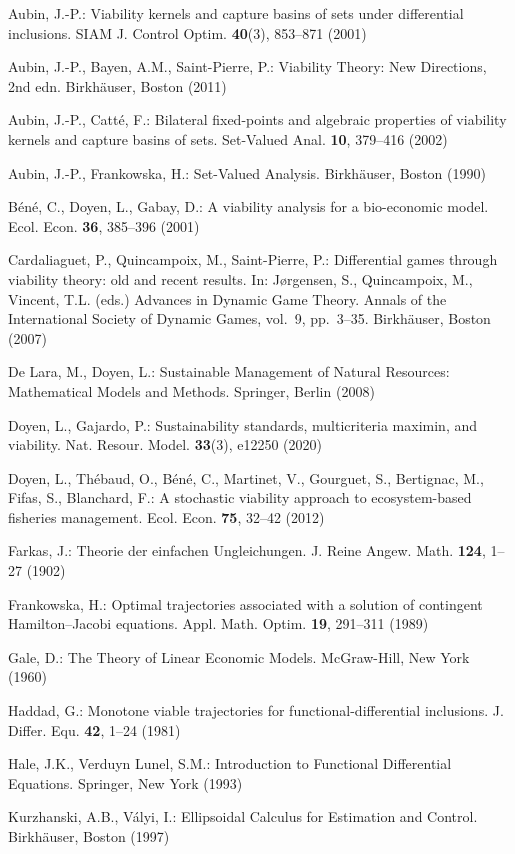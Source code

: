 \documentclass[11pt]{article}
\theoremstyle{definition}
\begin{document}
Aubin, J.-P.: Viability kernels and capture basins of sets under differential inclusions. SIAM J. Control Optim. \textbf{40}(3), 853--871 (2001)

Aubin, J.-P., Bayen, A.M., Saint-Pierre, P.: Viability Theory: New Directions, 2nd edn. Birkh\"auser, Boston (2011)

Aubin, J.-P., Catt\'e, F.: Bilateral fixed-points and algebraic properties of viability kernels and capture basins of sets. Set-Valued Anal. \textbf{10}, 379--416 (2002)

Aubin, J.-P., Frankowska, H.: Set-Valued Analysis. Birkh\"auser, Boston (1990)

B\'en\'e, C., Doyen, L., Gabay, D.: A viability analysis for a bio-economic
model. Ecol. Econ. \textbf{36}, 385--396 (2001)

Cardaliaguet, P., Quincampoix, M., Saint-Pierre, P.: Differential games
through viability theory: old and recent results. In: J\o{}rgensen, S.,
Quincampoix, M., Vincent, T.L. (eds.) Advances in Dynamic Game Theory.
Annals of the International Society of Dynamic Games, vol.~9, pp.~3--35.
Birkh\"auser, Boston (2007)

De Lara, M., Doyen, L.: Sustainable Management of Natural Resources:
Mathematical Models and Methods. Springer, Berlin (2008)

Doyen, L., Gajardo, P.: Sustainability standards, multicriteria maximin,
and viability. Nat. Resour. Model. \textbf{33}(3), e12250 (2020)

Doyen, L., Th\'ebaud, O., B\'en\'e, C., Martinet, V., Gourguet, S., Bertignac,
M., Fifas, S., Blanchard, F.: A stochastic viability approach to
ecosystem-based fisheries management. Ecol. Econ. \textbf{75}, 32--42
(2012)

Farkas, J.: Theorie der einfachen Ungleichungen. J. Reine Angew. Math.
\textbf{124}, 1--27 (1902)

Frankowska, H.: Optimal trajectories associated with a solution of
contingent Hamilton--Jacobi equations. Appl. Math. Optim. \textbf{19},
291--311 (1989)

Gale, D.: The Theory of Linear Economic Models. McGraw-Hill, New York
(1960)

Haddad, G.: Monotone viable trajectories for functional-differential
inclusions. J. Differ. Equ. \textbf{42}, 1--24 (1981)

Hale, J.K., Verduyn Lunel, S.M.: Introduction to Functional Differential
Equations. Springer, New York (1993)

Kurzhanski, A.B., V\'alyi, I.: Ellipsoidal Calculus for Estimation and
Control. Birkh\"auser, Boston (1997)
\end{document}
